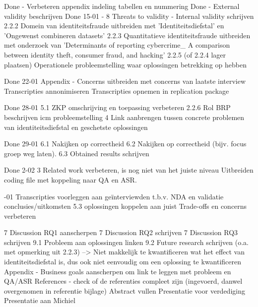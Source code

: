 Done - Verbeteren appendix indeling tabellen en nummering
Done - External validity beschrijven
Done 15-01 - 
8 Threats to validity - Internal validity schrijven
2.2.2 Domein van identiteitsfraude uitbreiden met 'Identiteitsdiefstal' en 'Ongewenst combineren datasets'
2.2.3 Quantitatieve identiteitsfraude uitbreiden met onderzoek van 'Determinants of reporting cybercrime_ A
comparison between identity theft, consumer fraud, and hacking'
2.2.5 (of 2.2.4 lager plaatsen) Operationele probleemstelling waar oplossingen betrekking op hebben

Done 22-01
Appendix - Concerns uitbreiden met concerns van laatste interview
Transcripties annonimiseren
Transcripties opnemen in replication package

Done 28-01
5.1 ZKP omschrijving en toepassing verbeteren
2.2.6 Rol BRP beschrijven icm probleemstelling
4 Link aanbrengen tussen concrete problemen van identiteitsdiefstal en geschetste oplossingen

Done 29-01
6.1 Nakijken op correctheid
6.2 Nakijken op correctheid (bijv. focus groep weg laten).
6.3 Obtained results schrijven

Done 2-02
3 Related work verbeteren, is nog niet van het juiste niveau
Uitbreiden coding file met koppeling naar QA en ASR.

-01
Transcripties voorleggen aan geïnterviewden t.b.v. NDA en validatie conclusies/uitkomsten
5.3 oplossingen koppelen aan juist Trade-offs en concerns verbeteren

7 Discussion RQ1 aanscherpen
7 Discussion RQ2 schrijven
7 Discussion RQ3 schrijven
9.1 Probleem aan oplossingen linken
9.2 Future research schrijven (o.a. met opmerking uit 2.2.3)
--> Niet makkelijk te kwantificeren wat het effect van identiteitsdiefstal is, dus ook niet eenvoudig om een oplossing te kwantificeren
Appendix - Business goals aanscherpen om link te leggen met probleem en QA/ASR
References - check of de referenties compleet zijn (ingevoerd, danwel overgenomen in referentie bijlage)
Abstract vullen
Presentatie voor verdediging
Presentatie aan Michiel